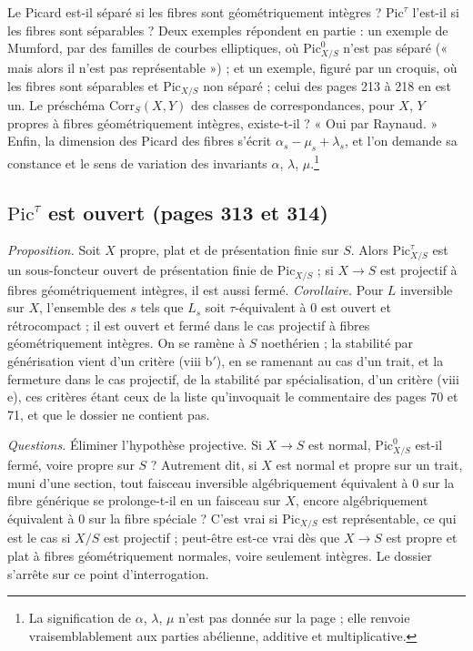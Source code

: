 \documentclass[11pt,a4paper]{article}
\begin{document}
Le Picard est-il séparé si les fibres sont géométriquement intègres ?
$\mathrm{Pic}^\tau$ l'est-il si les fibres sont séparables ? Deux exemples
répondent en partie : un exemple de Mumford, par des familles de courbes
elliptiques, où $\mathrm{Pic}^0_{X/S}$ n'est pas séparé (« mais alors il n'est
pas représentable ») ; et un exemple, figuré par un croquis, où les fibres sont
séparables et $\mathrm{Pic}_{X/S}$ non séparé ; celui des pages 213 à 218 en
est un. Le préschéma $\mathrm{Corr}_S(X, Y)$ des classes de correspondances,
pour $X$, $Y$ propres à fibres géométriquement intègres, existe-t-il ? « Oui
par Raynaud. » Enfin, la dimension des Picard des fibres s'écrit
$\alpha_s - \mu_s + \lambda_s$, et l'on demande sa constance et le sens de
variation des invariants $\alpha$, $\lambda$, $\mu$.\footnote{La signification
de $\alpha$, $\lambda$, $\mu$ n'est pas donnée sur la page ; elle renvoie
vraisemblablement aux parties abélienne, additive et multiplicative.}

\subsection*{$\mathrm{Pic}^\tau$ est ouvert (pages 313 et 314)}

\emph{Proposition.} Soit $X$ propre, plat et de présentation finie sur $S$.
Alors $\mathrm{Pic}^\tau_{X/S}$ est un sous-foncteur ouvert de présentation
finie de $\mathrm{Pic}_{X/S}$ ; si $X \to S$ est projectif à fibres
géométriquement intègres, il est aussi fermé. \emph{Corollaire.} Pour $L$
inversible sur $X$, l'ensemble des $s$ tels que $L_s$ soit $\tau$-équivalent à
$0$ est ouvert et rétrocompact ; il est ouvert et fermé dans le cas projectif
à fibres géométriquement intègres. On se ramène à $S$ noethérien ; la
stabilité par générisation vient d'un critère (viii b$'$), en se ramenant au
cas d'un trait, et la fermeture dans le cas projectif, de la stabilité par
spécialisation, d'un critère (viii e), ces critères étant ceux de la liste
qu'invoquait le commentaire des pages 70 et 71, et que le dossier ne contient
pas.

\emph{Questions.} Éliminer l'hypothèse projective. Si $X \to S$ est normal,
$\mathrm{Pic}^0_{X/S}$ est-il fermé, voire propre sur $S$ ? Autrement dit, si
$X$ est normal et propre sur un trait, muni d'une section, tout faisceau
inversible algébriquement équivalent à $0$ sur la fibre générique se
prolonge-t-il en un faisceau sur $X$, encore algébriquement équivalent à $0$
sur la fibre spéciale ? C'est vrai si $\mathrm{Pic}_{X/S}$ est représentable,
ce qui est le cas si $X/S$ est projectif ; peut-être est-ce vrai dès que
$X \to S$ est propre et plat à fibres géométriquement normales, voire
seulement intègres. Le dossier s'arrête sur ce point d'interrogation.
\end{document}
